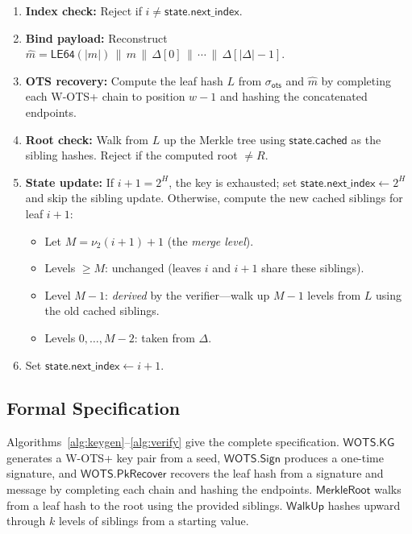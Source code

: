 \documentclass[11pt]{article}
\newcommand{\concat}{\,\|\,}
\begin{document}
\begin{enumerate}
\item \textbf{Index check:} Reject if $i \neq
\mathsf{state.next\_index}$.
\item \textbf{Bind payload:} Reconstruct
$\hat{m} = \mathsf{LE64}(|m|) \concat m \concat \Delta[0] \concat
\cdots \concat \Delta[|\Delta|-1]$.
\item \textbf{OTS recovery:} Compute the leaf hash $L$ from
$\sigma_{\mathsf{ots}}$ and $\hat{m}$ by completing each W-OTS+ chain
to position $w - 1$ and hashing the concatenated endpoints.
\item \textbf{Root check:} Walk from $L$ up the Merkle tree using
$\mathsf{state.cached}$ as the sibling hashes. Reject if the computed
root $\neq R$.
\item \textbf{State update:} If $i + 1 = 2^H$, the key is exhausted;
set $\mathsf{state.next\_index} \leftarrow 2^H$ and skip the sibling
update. Otherwise, compute the new cached siblings for leaf $i + 1$:
\begin{itemize}
\item Let $M = \nu_2(i+1) + 1$ (the \emph{merge level}).
\item Levels $\geq M$: unchanged (leaves $i$ and $i+1$ share these
siblings).
\item Level $M - 1$: \emph{derived} by the verifier---walk up $M - 1$
levels from $L$ using the old cached siblings.
\item Levels $0, \ldots, M - 2$: taken from $\Delta$.
\end{itemize}
\item Set $\mathsf{state.next\_index} \leftarrow i + 1$.
\end{enumerate}

\subsection{Formal Specification}

Algorithms~\ref{alg:keygen}--\ref{alg:verify} give the complete
specification. $\mathsf{WOTS.KG}$ generates a W-OTS+ key pair from a
seed, $\mathsf{WOTS.Sign}$ produces a one-time signature, and
$\mathsf{WOTS.PkRecover}$ recovers the leaf hash from a signature and
message by completing each chain and hashing the endpoints.
$\mathsf{MerkleRoot}$ walks from a leaf hash to the root using
the provided siblings. $\mathsf{WalkUp}$ hashes upward through
$k$ levels of siblings from a starting value.
\end{document}
